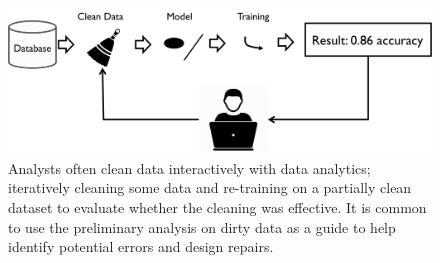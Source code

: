 % 
% 

\begin{figure}[t]
\centering
 \includegraphics[width=0.8\columnwidth]{figs/workflow.png}
 \caption{Analysts often clean data interactively with data analytics; iteratively cleaning some data and re-training on a partially clean dataset to evaluate whether the cleaning was effective. It is common to use the preliminary analysis on dirty data as a guide to help identify potential errors and design repairs. \label{cartoon}}
\end{figure}

